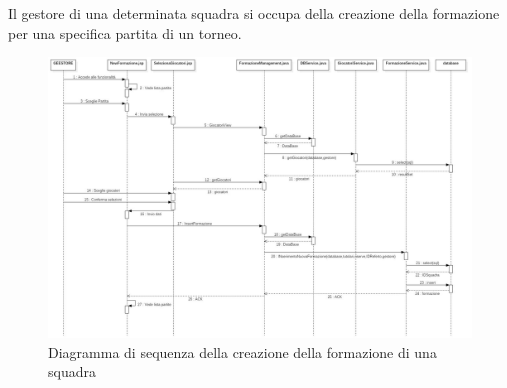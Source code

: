Il gestore di una determinata squadra si occupa della creazione della formazione per una specifica partita di un torneo.

%
%
\begin{figure}[h]
	\centering
	\includegraphics[width=1\textwidth]
	{immagini/sd-partita}
	
	\caption{Diagramma di sequenza della creazione della formazione di una squadra}
\end{figure}